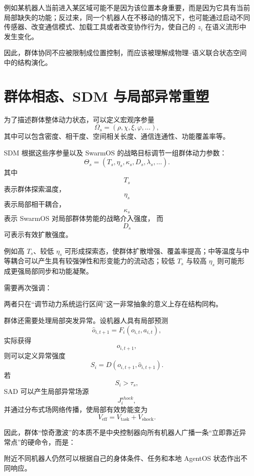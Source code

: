 例如某机器人当前进入某区域可能不是因为该位置本身重要，而是因为它具有当前局部缺失的功能；反过来，同一个机器人在不移动的情况下，也可能通过启动不同传感器、改变通信模式、加载工具或者改变协作行为，使自己的 $z_i$ 在语义流形中发生变化。

因此，群体协同不应被限制成位置控制，而应该被理解成物理--语义联合状态空间中的结构演化。


\section{群体相态、SDM 与局部异常重塑}

为了描述群体整体动力状态，可以定义宏观序参量
\[
\Omega_s
=
(
\rho,
\chi,
\xi,
\varphi,
\ldots
),
\]
其中可以包含密度、相干度、空间相关长度、通信连通性、功能覆盖率等。

SDM 根据这些序参量以及 SwarmOS 的战略目标调节一组群体动力参数：
\[
\Theta_s
=
(
T_s,
\eta_s,
\kappa_s,
D_s,
\lambda_s,\ldots
).
\]
其中
\[
T_s
\]
表示群体探索温度，
\[
\eta_s
\]
表示局部相干耦合，
\[
\kappa_s
\]
表示 SwarmOS 对局部群体势能的战略介入强度，
而
\[
D_s
\]
可表示有效扩散强度。

例如高 $T_s$、较低 $\eta_s$ 可形成探索态，使群体扩散增强、覆盖率提高；中等温度与中等耦合可以产生具有较强弹性和形变能力的流动态；较低 $T_s$ 与较高 $\eta_s$ 则可能形成更强局部同步和功能凝聚。

需要再次强调：
\begin{statementbox}
\centering
{}
\end{statementbox}
两者只在“调节动力系统运行区间”这一非常抽象的意义上存在结构同构。

群体还需要处理局部突发异常。设机器人具有局部预测
\[
\hat o_{i,t+1}
=
F_i(o_{i,t},a_{i,t}),
\]
实际获得
\[
o_{i,t+1},
\]
则可以定义异常强度
\[
S_i
=
D(
o_{i,t+1},
\hat o_{i,t+1}
).
\]
若
\[
S_i>\tau_s,
\]
SAD 可以产生局部异常场源
\[
J_i^{shock},
\]
并通过分布式场网络传播，使局部有效势能变为
\[
V_{\mathrm{eff}}
=
V_{\mathrm{task}}
+
V_{\mathrm{shock}}.
\]

因此，群体“惊奇激波”的本质不是中央控制器向所有机器人广播一条“立即靠近异常点”的硬命令，而是：
\begin{statementbox}
\centering
{}
\end{statementbox}
附近不同机器人仍然可以根据自己的身体条件、任务和本地 AgentOS 状态作出不同响应。



